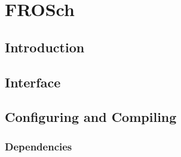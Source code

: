 \chapter{FROSch}
\label{C:FROSch}


\section{Introduction}\label{S:FROSch:Introduction}

\section{Interface}\label{S:FROSch:Interface}

\section{Configuring and Compiling}\label{S::FROSch:Config}

\subsection{Dependencies}

